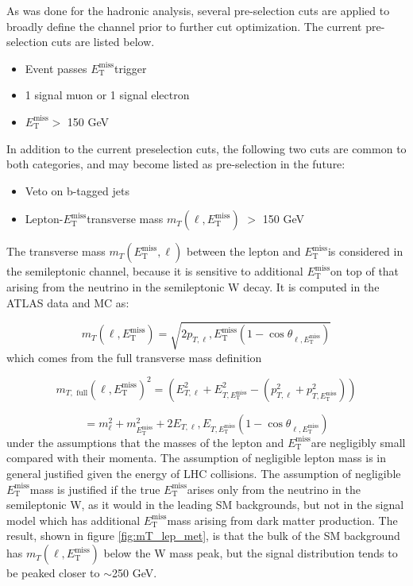 \documentclass[12pt]{article}
\newcommand*{\met}{\ensuremath{E_\text{T}^\text{miss}}}
\begin{document}
As was done for the hadronic analysis, several pre-selection cuts are applied to broadly define the channel prior to further cut optimization. The current pre-selection cuts are listed below.

\begin{itemize}
\item Event passes \met trigger
\item 1 signal muon or 1 signal electron
\item \met $>$ 150 GeV
\end{itemize}

In addition to the current preselection cuts, the following two cuts are common to both categories, and may become listed as pre-selection in the future:

\begin{itemize}
\item Veto on b-tagged jets
\item Lepton-\met transverse mass $m_T(\ell, \met)$ $>$ 150 GeV
\end{itemize}

The transverse mass $m_T(\met, \ell)$ between the lepton and \met is considered in the semileptonic channel, because it is sensitive to additional \met on top of that arising from the neutrino in the semileptonic W decay. It is computed in the ATLAS data and MC as:

\begin{equation}
m_T(\ell, \met) = \sqrt{2p_{T, \ell}, \met(1-\cos\theta_{\ell, \met})}
\end{equation}
which comes from the full transverse mass definition \cite{PDG_kin}

\begin{equation}
m_{T, \text{ full}}(\ell, \met)^2 = (E_{T, \ell}^2 + E_{T, \met}^2 - (p_{T, \ell}^2 + p_{T, \met}^2)) 
\end{equation}

$$
= m_\ell^2+m_{\met}^2 + 2E_{T, \ell}, E_{T, \met}(1-\cos\theta_{\ell, \met})
$$
under the assumptions that the masses of the lepton and \met are negligibly small compared with their momenta. The assumption of negligible lepton mass is in general justified given the energy of LHC collisions. The assumption of negligible \met mass is justified if the true \met arises only from the neutrino in the semileptonic W, as it would in the leading SM backgrounds, but not in the signal model which has additional \met mass arising from dark matter production. The result, shown in figure \ref{fig:mT_lep_met}, is that the bulk of the SM background has $m_T(\ell, \met)$ below the W mass peak, but the signal distribution tends to be peaked closer to $\sim$250 GeV. 
\end{document}
